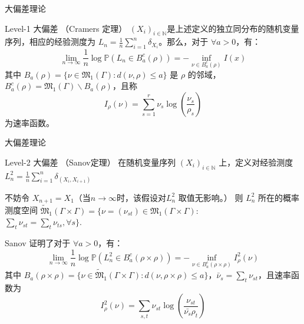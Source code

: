 \documentclass{beamer}
\begin{document}
	\begin{frame}{大偏差理论}
		\begin{block}{Level-1 大偏差 （Cramers 定理）}
			$(\mathit{X}_i)_{i\in \mathbb{N}}$是上述定义的独立同分布的随机变量序列，相应的经验测度为 $\mathit{L}_n = \frac{1}{n} \sum_{i=1}^n \delta_{\mathit{X}_i}$。那么，对于 $\forall a>0$，有：
			$$
			\lim_{n \rightarrow \infty} \frac{1}{n} \log \mathbb{P} \left(\mathit{L}_n \in \mathit{B}_a^c(\rho)\right) = -\inf_{\nu \in \mathit{B}_a^c(\rho)} \mathit{I}(x)
			$$
			其中 $\mathit{B}_a(\rho)=\{\nu \in \mathfrak{M}_1(\Gamma): d(\nu,  \rho) \le a\}$ 是 $\rho$ 的邻域，$\mathit{B}_a^c(\rho) = \mathfrak{M}_1(\Gamma) \backslash  \mathit{B}_a(\rho)$，且称
			$$
			\mathit{I}_{\rho}(\nu) = \sum_{s=1}^r \nu_s \log \left(\frac{\nu_s}{\rho_s}\right)
			$$
			为速率函数。
		\end{block}
	\end{frame}

	\begin{frame}{大偏差理论}
		\begin{block}{Level-2 大偏差 （Sanov定理）}
			在随机变量序列 $(\mathit{X}_i)_{i\in \mathbb{N}}$ 上，定义对经验测度
			$\mathit{L}_n^2 = \frac{1}{n} \sum_{i=1}^n \delta_{(\mathit{X}_i, \mathit{X}_{i+1})}$
			
			不妨令 $\mathit{X}_{n+1} = \mathit{X}_1$（当$n\rightarrow \infty$时，该假设对$\mathit{L}_n^2$ 取值无影响。）
			则 $\mathit{L}_n^2$ 所在的概率测度空间
			$\widetilde{\mathfrak{M}}_1(\Gamma \times \Gamma) = \{\nu=(\nu_{st}) \in \mathfrak{M}_1(\Gamma \times \Gamma):$ \\$ \sum_{t} \nu_{st} = \sum_{t} \nu_{ts}, \forall s\}.$
		
			Sanov 证明了对于 $\forall a > 0$，有：
			$$
			\lim_{n \rightarrow \infty} \frac{1}{n} \log \mathbb{P}(\mathit{L}_n^2 \in B_a^c(\rho \times \rho))
			= - \inf_{\nu \in B_a^c(\rho \times \rho)} \mathit{I}_{\rho}^2(\nu)
			$$
			其中 $B_a(\rho \times \rho) = \{\nu \in \widetilde{\mathfrak{M}}_1(\Gamma \times \Gamma): d(\nu, \rho \times \rho) \le a\}$，$\bar{\nu}_s = \sum_t \nu_{st}$，且速率函数为
			$$
			\mathit{I}_{\rho}^2(\nu) = \sum_{s,t} \nu_{st} \log\left(\frac{\nu_{st}}{\bar{\nu_s}\rho_t}\right)
			$$
		\end{block} 
	\end{frame}
\end{document}
